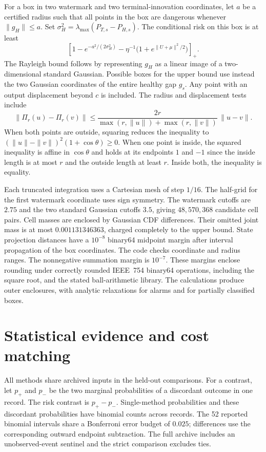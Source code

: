 For a box in two watermark and two terminal-innovation coordinates, let \(a\) be a certified radius such that all points in the box are dangerous whenever \(\|g_H\|\le a\). Set \(\sigma_H^2=\lambda_{\max}(P_{T,s}-P_{H,s})\). The conditional risk on this box is at least
\[
 \left[1-e^{-a^2/(2\sigma_H^2)}
     -\eta^{-1}\big(1+e^{\|U+\mu\|^2/2}\big)\right]_+.
\]
The Rayleigh bound follows by representing \(g_H\) as a linear image of a two-dimensional standard Gaussian. Possible boxes for the upper bound use instead the two Gaussian coordinates of the entire healthy gap \(g_s\). Any point with an output displacement beyond \(c\) is included. The radius and displacement tests include
\[
 \|\Pi_r(u)-\Pi_r(v)\|
 \le \frac{2r}{\max(r,\|u\|)+\max(r,\|v\|)}\,\|u-v\|.
\]
When both points are outside, squaring reduces the inequality to
\((\|u\|-\|v\|)^2(1+\cos\theta)\ge0\). When one point is inside, the squared inequality is affine in \(\cos\theta\) and holds at its endpoints \(1\) and \(-1\) since the inside length is at most \(r\) and the outside length at least \(r\). Inside both, the inequality is equality.

Each truncated integration uses a Cartesian mesh of step \(1/16\). The half-grid for the first watermark coordinate uses sign symmetry. The watermark cutoffs are \(2.75\) and the two standard Gaussian cutoffs \(3.5\), giving \(48{,}570{,}368\) candidate cell pairs. Cell masses are enclosed by Gaussian CDF differences. Their omitted joint mass is at most \(0.001131346363\), charged completely to the upper bound. State projection distances have a \(10^{-8}\) binary64 midpoint margin after interval propagation of the box coordinates. The code checks coordinate and radius ranges. The nonnegative summation margin is \(10^{-7}\). These margins enclose rounding under correctly rounded IEEE~754 binary64 operations, including the square root, and the stated ball-arithmetic library. The calculations produce outer enclosures, with analytic relaxations for alarms and for partially classified boxes.

\section{Statistical evidence and cost matching}
\label{app:archive}

All methods share archived inputs in the held-out comparisons. For a contrast, let \(p_+\) and \(p_-\) be the two marginal probabilities of a discordant outcome in one record. The risk contrast is \(p_+-p_-\). Single-method probabilities and these discordant probabilities have binomial counts across records. The 52 reported binomial intervals share a Bonferroni error budget of \(0.025\); differences use the corresponding outward endpoint subtraction. The full archive includes an unobserved-event sentinel and the strict comparison excludes ties.

